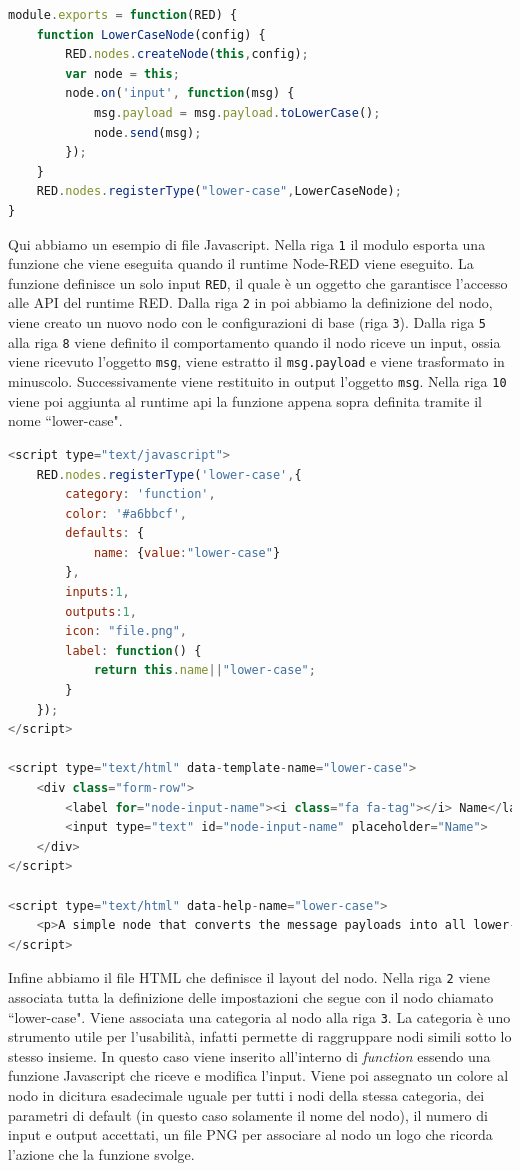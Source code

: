 \documentclass[a4paper,10pt]{memoir}
\begin{document}
\begin{lstlisting}[language=Javascript]
module.exports = function(RED) {
    function LowerCaseNode(config) {
        RED.nodes.createNode(this,config);
        var node = this;
        node.on('input', function(msg) {
            msg.payload = msg.payload.toLowerCase();
            node.send(msg);
        });
    }
    RED.nodes.registerType("lower-case",LowerCaseNode);
}
\end{lstlisting}
Qui abbiamo un esempio di file Javascript. Nella riga \texttt{1} il modulo esporta una funzione che viene eseguita quando il runtime Node-RED viene eseguito. La funzione definisce un solo input \texttt{RED}, il quale è un oggetto che garantisce l'accesso alle API del runtime RED.
Dalla riga \texttt{2} in poi abbiamo la definizione del nodo, viene creato un nuovo nodo con le configurazioni di base (riga \texttt{3}). Dalla riga \texttt{5} alla riga \texttt{8} viene definito il comportamento quando il nodo riceve un input, ossia viene ricevuto l'oggetto \texttt{msg}, viene estratto il \texttt{msg.payload} e viene trasformato in minuscolo.
Successivamente viene restituito in output l'oggetto \texttt{msg}.
Nella riga \texttt{10} viene poi aggiunta al runtime api la funzione appena sopra definita tramite il nome ``lower-case".

\begin{lstlisting}[language=Javascript]
<script type="text/javascript">
    RED.nodes.registerType('lower-case',{
        category: 'function',
        color: '#a6bbcf',
        defaults: {
            name: {value:"lower-case"}
        },
        inputs:1,
        outputs:1,
        icon: "file.png",
        label: function() {
            return this.name||"lower-case";
        }
    });
</script>

<script type="text/html" data-template-name="lower-case">
    <div class="form-row">
        <label for="node-input-name"><i class="fa fa-tag"></i> Name</label>
        <input type="text" id="node-input-name" placeholder="Name">
    </div>
</script>

<script type="text/html" data-help-name="lower-case">
    <p>A simple node that converts the message payloads into all lower-case characters</p>
</script>
\end{lstlisting}
Infine abbiamo il file HTML che definisce il layout del nodo.
Nella riga \texttt{2} viene associata tutta la definizione delle impostazioni che segue con il nodo chiamato ``lower-case".
Viene associata una categoria al nodo alla riga \texttt{3}. La categoria è uno strumento utile per l'usabilità, infatti permette di raggruppare nodi simili sotto lo stesso insieme. In questo caso viene inserito all'interno di \textit{function} essendo una funzione Javascript che riceve e modifica l'input.
Viene poi assegnato un colore al nodo in dicitura esadecimale uguale per tutti i nodi della stessa categoria, dei parametri di default (in questo caso solamente il nome del nodo), il numero di input e output accettati, un file PNG per associare al nodo un logo che ricorda l'azione che la funzione svolge.
\end{document}
